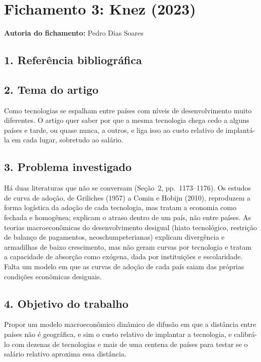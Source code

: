 \section{Fichamento 3: Knez (2023)}

\noindent\textbf{Autoria do fichamento:} Pedro Dias Soares

\subsection*{1. Referência bibliográfica}
\noindent{}

\subsection*{2. Tema do artigo}
Como tecnologias se espalham entre países com níveis de desenvolvimento muito diferentes. O artigo
quer saber por que a mesma tecnologia chega cedo a alguns países e tarde, ou quase nunca, a outros,
e liga isso ao custo relativo de implantá-la em cada lugar, sobretudo ao salário.

\subsection*{3. Problema investigado}
Há duas literaturas que não se conversam (Seção~2, pp.~1173--1176). Os estudos de curva de adoção,
de Griliches (1957) a Comin e Hobijn (2010), reproduzem a forma logística da adoção de cada
tecnologia, mas tratam a economia como fechada e homogênea; explicam o atraso dentro de um país, não
entre países. As teorias macroeconômicas do desenvolvimento desigual (hiato tecnológico, restrição
de balanço de pagamentos, neoschumpeterianas) explicam divergência e armadilhas de baixo
crescimento, mas não geram curvas por tecnologia e tratam a capacidade de absorção como exógena,
dada por instituições e escolaridade. Falta um modelo em que as curvas de adoção de cada país saiam
das próprias condições econômicas desiguais.

\subsection*{4. Objetivo do trabalho}
Propor um modelo macroeconômico dinâmico de difusão em que a distância entre países não é
geográfica, e sim o custo relativo de implantar a tecnologia, e calibrá-lo com dezenas de
tecnologias e mais de uma centena de países para testar se o salário relativo aproxima essa
distância.


